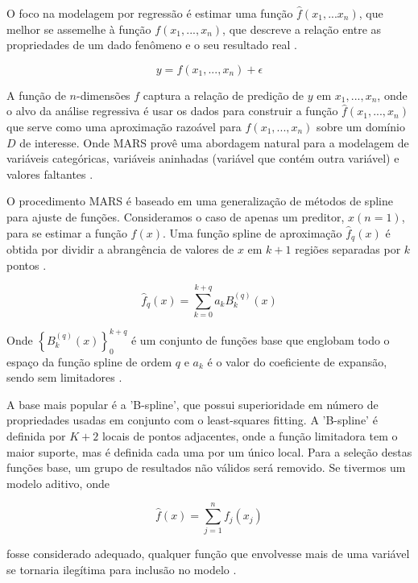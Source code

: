 \documentclass[
    12pt,               %
    openright,          %
    oneside,            %
    a4paper,            %
    english,            %
    brazil              %
    ]{abntex2}
\begin{document}
O foco na modelagem por regressão é estimar uma função $\hat{f}(x_1,...x_n)$, que melhor se assemelhe à função 
$f(x_1,...,x_n)$, que descreve a relação entre as propriedades de um dado fenômeno e o seu resultado real
\cite{MARS}. 

\begin{equation}
    \label{eq:mars_base}
    y = f(x_1,...,x_n) + \epsilon
\end{equation}

A função de $n$-dimensões $f$ captura a relação de predição de $y$ em $x_1,...,x_n$, onde o alvo da análise regressiva
é usar os dados para construir a função $\hat{f}(x_1,...,x_n)$ que serve como uma aproximação razoável para
$f(x_1,...,x_n)$ sobre um domínio $D$ de interesse. Onde MARS provê uma abordagem natural para a modelagem de variáveis
categóricas, variáveis aninhadas (variável que contém outra variável) e valores faltantes \cite{intro_mars}.

O procedimento MARS é baseado em uma generalização de métodos de spline para ajuste de funções. Consideramos o caso de
apenas um preditor, $x(n = 1)$, para se estimar a função $f(x)$. Uma função spline de aproximação $\hat{f}_q(x)$ é obtida por
dividir a abrangência de valores de $x$ em $k+1$ regiões separadas por $k$ pontos \cite{intro_mars}.

\begin{equation}
    \label{eq:aproximacao_spline}
    \hat{f}_q(x) = \sum_{k=0}^{k+q}a_kB_k^{(q)}(x)
\end{equation}

Onde $\left\{B_k^{(q)}(x)\right\}_{0}^{k+q}$ é um conjunto de funções base que englobam todo o espaço da função spline de ordem $q$ e $a_k$ é o
valor do coeficiente de expansão, sendo sem limitadores \cite{intro_mars}.

A base mais popular é a 'B-spline', que possui superioridade em número de propriedades usadas em conjunto com o least-squares 
fitting. A 'B-spline' é definida por $K+2$ locais de pontos adjacentes, onde a função limitadora tem o maior suporte,
mas é definida cada uma por um único local. Para a seleção destas funções base, um grupo de resultados
não válidos será removido. Se tivermos um modelo aditivo, onde

\begin{equation}
    \hat{f}(x) = \sum_{j=1}^{n}f_j(x_j)
\end{equation}

fosse considerado adequado, qualquer função que envolvesse mais de uma variável se tornaria ilegítima para inclusão no modelo \cite{intro_mars}.
\end{document}
